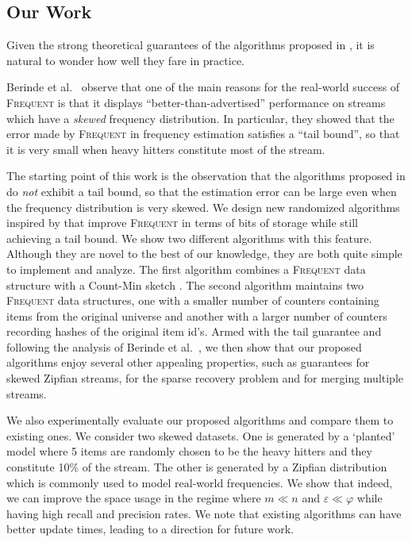\documentclass[sigconf,review=true,anonymous=true,screen]{acmart}
\newcommand{\eps}{\varepsilon}
\renewcommand{\phi}{\varphi}
\begin{document}
\subsection{Our Work}
Given the strong theoretical guarantees of the algorithms proposed in \cite{BDW16}, it is natural to wonder how well they fare in practice. 

Berinde et al.~\cite{BCIS} observe that one of the main reasons for the real-world success of \textsc{Frequent} is that it displays ``better-than-advertised'' performance on streams which have a {\em skewed} frequency distribution. In particular, they showed that the error made by \textsc{Frequent} in frequency estimation satisfies a ``tail bound'', so that it is very small when heavy hitters constitute most of the stream.

The starting point of this work is the observation that the algorithms proposed in \cite{BDW16} do {\em not} exhibit a tail bound, so that the estimation error can be large even when the frequency distribution is very skewed. We design new randomized algorithms inspired by \cite{BDW16} that improve \textsc{Frequent} in terms of bits of storage while still achieving a tail bound. We show two different algorithms with this feature. Although they are novel to the best of our knowledge, they are both quite simple to implement and analyze. The first algorithm combines a \textsc{Frequent} data structure with a Count-Min sketch \cite{CM05}. The second algorithm maintains two \textsc{Frequent} data structures, one with a smaller number of counters containing items from the original universe and another with a larger number of counters recording hashes of the original item id's.
Armed with the tail guarantee and following the analysis of Berinde et al.~\cite{BCIS}, we then show that our proposed algorithms enjoy several other appealing properties, such as guarantees for skewed Zipfian streams, for the sparse recovery problem and for merging multiple streams.

We also experimentally evaluate our proposed algorithms and compare them to existing ones. We consider two skewed datasets. One is generated by a `planted' model where 5 items are randomly chosen to be the heavy hitters and they constitute 10\% of the stream. The other is generated by a Zipfian distribution which is commonly used to model real-world frequencies. We show that indeed, we can improve the space usage in the regime where $m\ll n$ and $\eps \ll \phi$ while having high recall and precision rates. We note that existing algorithms can have better update times, leading to a direction for future work.
\end{document}
